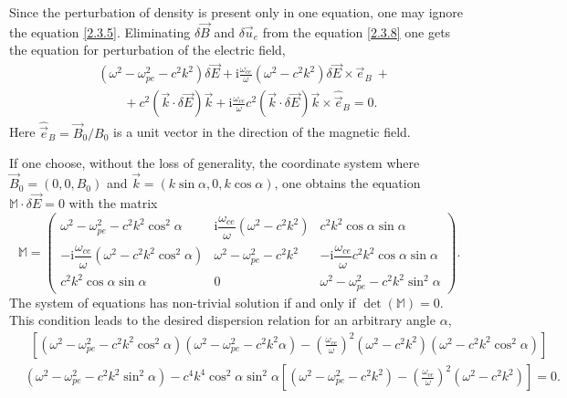 Since the perturbation of density is present only in one equation, one may ignore the equation \ref{2.3.5}. Eliminating $ \delta \vec{B} $ and $ \delta \vec{u}_{e} $ from the equation \ref{2.3.8} one gets the equation for perturbation of the electric field,
\begin{equation}
\begin{split}
\label{2.3.9}
& \left( \omega^{2} - \omega_{pe}^{2} - c^{2} k^{2} \right) \delta \vec{E} + \mathrm{i} \frac{\omega_{ce}}{\omega} \left( \omega^{2} - c^{2} k^{2} \right) \delta \vec{E} \times \vec{e}_{B} \: + \\[5pt]
& \qquad + c^{2} \left( \vec{k} \cdot \delta \vec{E} \right) \vec{k} + \mathrm{i} \frac{\omega_{ce}}{\omega} c^{2} \left( \vec{k} \cdot \delta \vec{E} \right) \vec{k} \times \hat{\vec{e}}_{B} = 0.
\end{split}
\end{equation}
Here $ \hat{\vec{e}}_{B} = \vec{B}_{0}/B_{0} $ is a unit vector in the direction of the magnetic field.

If one choose, without the loss of generality, the coordinate system where $ \vec{B}_{0} = (0, 0, B_{0}) $ and $ \vec{k} = (k \sin \alpha, 0, k \cos \alpha) $, one obtains the equation $ \mathbb{M} \cdot \delta \vec{E} = 0 $ with the matrix
\begingroup
\renewcommand*{\arraystretch}{2.0}
\begin{equation}
\label{2.3.11}
\mathbb{M} =  \begin{pmatrix}
 \omega^{2} - \omega_{pe}^{2} - c^{2} k^{2} \cos^{2} \alpha & \mathrm{i} \dfrac{\omega_{ce}}{\omega} \left( \omega^{2} - c^{2} k^{2} \right)  & c^{2} k^{2} \cos \alpha \sin \alpha \\
 - \mathrm{i} \dfrac{\omega_{ce}}{\omega} \left( \omega^{2} - c^{2} k^{2} \cos^{2} \alpha \right) & \omega^{2} - \omega_{pe}^{2} - c^{2} k^{2} & - \mathrm{i} \dfrac{\omega_{ce}}{\omega} c^{2} k^{2} \cos \alpha \sin \alpha \\
 c^{2} k^{2} \cos \alpha \sin \alpha & 0 & \omega^{2} - \omega_{pe}^{2} - c^{2} k^{2} \sin^{2} \alpha
 \end{pmatrix}.
\end{equation} 
\endgroup
The system of equations has non-trivial solution if and only if $ \det \left( \mathbb{M} \right) = 0 $. This condition leads to the desired dispersion relation for an arbitrary angle $ \alpha $,
\begin{equation}
\begin{split}
\label{2.3.12}
& \ \ \left[ \left( \omega^{2} - \omega_{pe}^{2} - c^{2} k^{2} \cos^{2} \alpha \right) \left( \omega^{2} - \omega_{pe}^{2} - c^{2} k^{2} \alpha \right) - \left(  \frac{\omega_{ce}}{\omega} \right)^{2} \left( \omega^{2} - c^{2} k^{2} \right) \left( \omega^{2} - c^{2} k^{2} \cos^{2} \alpha \right) \right]\\[5pt]
& \left( \omega^{2} - \omega_{pe}^{2} - c^{2} k^{2} \sin^{2} \alpha \right) - c^{4} k^{4} \cos^{2} \alpha \sin^{2} \alpha \left[ \left( \omega^{2} - \omega_{pe}^{2} - c^{2} k^{2} \right) - \left( \frac{\omega_{ce}}{\omega} \right)^{2} \left( \omega^{2} - c^{2} k^{2} \right) \right] = 0.\\[5pt]
\end{split}
\end{equation}


